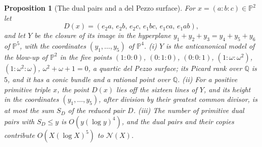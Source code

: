 \documentclass[11pt]{amsart}
\newtheorem{proposition}[theorem]{Proposition}
\theoremstyle{definition}
\theoremstyle{remark}
\newcommand{\Q}{\mathbb{Q}}
\newcommand{\PP}{\mathbb{P}}
\newcommand{\N}{\mathcal{N}}
\begin{document}
\begin{proposition}[The dual pairs and a del Pezzo surface]\label{prop:delpezzo}
For $x=(a:b:c)\in\PP^2$ let
\[
  D(x)=(e_2a,\,e_2b,\,e_2c,\,e_1bc,\,e_1ca,\,e_1ab),
\]
and let $Y$ be the closure of its image in the hyperplane $y_1+y_2+y_3=y_4+y_5+y_6$ of $\PP^5$, with the coordinates $(y_1,\dots,y_5)$ of $\PP^4$.
\textup{(i)} $Y$ is the anticanonical model of the blow-up of $\PP^2$ in the five points $(1:0:0)$, $(0:1:0)$, $(0:0:1)$, $(1:\omega:\omega^2)$, $(1:\omega^2:\omega)$, $\omega^2+\omega+1=0$, a quartic del Pezzo surface; its Picard rank over $\Q$ is $5$, and it has a conic bundle and a rational point over $\Q$.
\textup{(ii)} For a positive primitive triple $x$, the point $D(x)$ lies off the sixteen lines of $Y$, and its height in the coordinates $(y_1,\dots,y_5)$, after division by their greatest common divisor, is at most the sum $S_D$ of the reduced pair $D$.
\textup{(iii)} The number of primitive dual pairs with $S_D\le y$ is $O(y(\log y)^4)$, and the dual pairs and their copies contribute $O(X(\log X)^5)$ to $\N(X)$.
\end{proposition}
\end{document}
